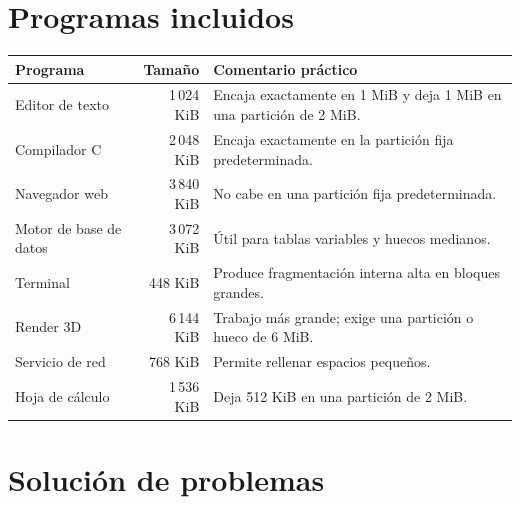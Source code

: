 \documentclass[11pt,a4paper]{article}
\begin{document}
\section{Programas incluidos}

\begin{longtable}{p{}r p{}}
\toprule
\textbf{Programa} & \textbf{Tamaño} & \textbf{Comentario práctico}\\
\midrule
\endhead
Editor de texto & 1\,024 KiB & Encaja exactamente en 1 MiB y deja 1 MiB en una partición de 2 MiB.\\
Compilador C & 2\,048 KiB & Encaja exactamente en la partición fija predeterminada.\\
Navegador web & 3\,840 KiB & No cabe en una partición fija predeterminada.\\
Motor de base de datos & 3\,072 KiB & Útil para tablas variables y huecos medianos.\\
Terminal & 448 KiB & Produce fragmentación interna alta en bloques grandes.\\
Render 3D & 6\,144 KiB & Trabajo más grande; exige una partición o hueco de 6 MiB.\\
Servicio de red & 768 KiB & Permite rellenar espacios pequeños.\\
Hoja de cálculo & 1\,536 KiB & Deja 512 KiB en una partición de 2 MiB.\\
\bottomrule
\end{longtable}

\section{Solución de problemas}
\end{document}
